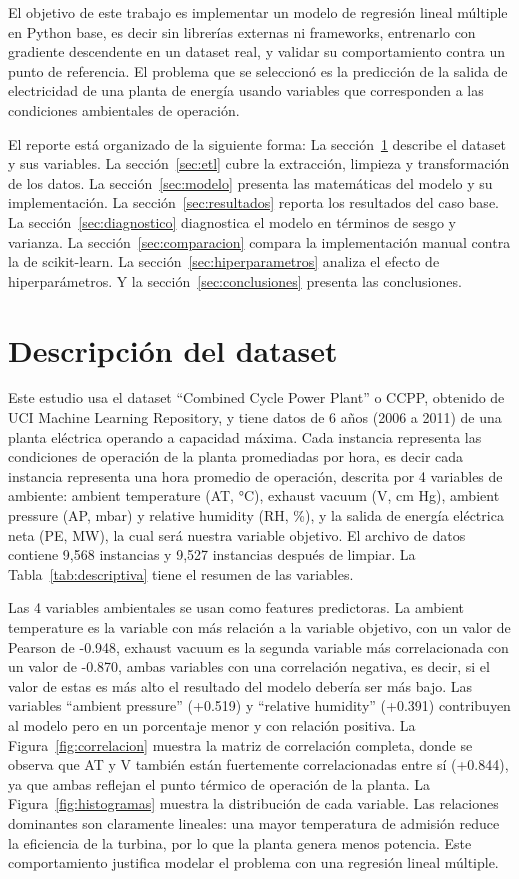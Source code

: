 \documentclass[conference]{IEEEtran}
\begin{document}
El objetivo de este trabajo es implementar un modelo de regresión lineal múltiple en Python base, es decir sin librerías externas ni frameworks, entrenarlo con gradiente descendente en un dataset real, y validar su comportamiento contra un punto de referencia. El problema que se seleccionó es la predicción de la salida de electricidad de una planta de energía usando variables que corresponden a las condiciones ambientales de operación.

El reporte está organizado de la siguiente forma: La sección~\ref{sec:dataset} describe el dataset y sus variables. La sección~\ref{sec:etl} cubre la extracción, limpieza y transformación de los datos. La sección~\ref{sec:modelo} presenta las matemáticas del modelo y su implementación. La sección~\ref{sec:resultados} reporta los resultados del caso base. La sección~\ref{sec:diagnostico} diagnostica el modelo en términos de sesgo y varianza. La sección~\ref{sec:comparacion} compara la implementación manual contra la de scikit-learn. La sección~\ref{sec:hiperparametros} analiza el efecto de hiperparámetros. Y la sección~\ref{sec:conclusiones} presenta las conclusiones.

\section{Descripción del dataset}
\label{sec:dataset}
Este estudio usa el dataset ``Combined Cycle Power Plant'' o CCPP, obtenido de UCI Machine Learning Repository, y tiene datos de 6 años (2006 a 2011) de una planta eléctrica operando a capacidad máxima. Cada instancia representa las condiciones de operación de la planta promediadas por hora, es decir cada instancia representa una hora promedio de operación, descrita por 4 variables de ambiente: ambient temperature (AT, °C), exhaust vacuum (V, cm Hg), ambient pressure (AP, mbar) y relative humidity (RH, \%), y la salida de energía eléctrica neta (PE, MW), la cual será nuestra variable objetivo. El archivo de datos contiene 9,568 instancias y 9,527 instancias después de limpiar. La Tabla~\ref{tab:descriptiva} tiene el resumen de las variables.

Las 4 variables ambientales se usan como features predictoras. La ambient temperature es la variable con más relación a la variable objetivo, con un valor de Pearson de -0.948, exhaust vacuum es la segunda variable más correlacionada con un valor de -0.870, ambas variables con una correlación negativa, es decir, si el valor de estas es más alto el resultado del modelo debería ser más bajo. Las variables ``ambient pressure'' (+0.519) y ``relative humidity'' (+0.391) contribuyen al modelo pero en un porcentaje menor y con relación positiva. La Figura~\ref{fig:correlacion} muestra la matriz de correlación completa, donde se observa que AT y V también están fuertemente correlacionadas entre sí (+0.844), ya que ambas reflejan el punto térmico de operación de la planta. La Figura~\ref{fig:histogramas} muestra la distribución de cada variable. Las relaciones dominantes son claramente lineales: una mayor temperatura de admisión reduce la eficiencia de la turbina, por lo que la planta genera menos potencia. Este comportamiento justifica modelar el problema con una regresión lineal múltiple.
\end{document}
